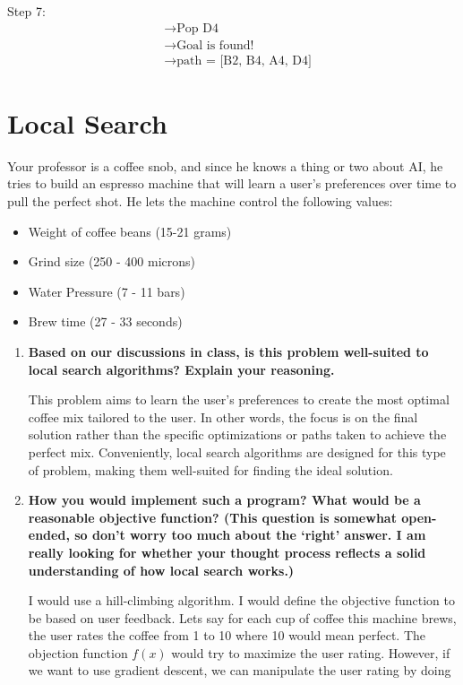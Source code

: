 \documentclass[a4paper]{article}
\begin{document}
\begin{sloppypar}
\begin{enumerate}[start=6,label=Q\arabic*,left=0pt]
    \par Step 7:
    \begin{align*}
        &\rightarrow \text{Pop D4} \\
        &\rightarrow \text{Goal is found!} \\
        &\rightarrow \text{path = [B2, B4, A4, D4]}
    \end{align*}

\end{enumerate}

\section{Local Search}

Your professor is a coffee snob, and since he knows a thing or two about AI, he tries to
build an espresso machine that will learn a user’s preferences over time to pull the perfect
shot. He lets the machine control the following values:

\begin{itemize}
    \item Weight of coffee beans (15-21 grams)
    \item Grind size (250 - 400 microns)
    \item Water Pressure (7 - 11 bars)
    \item Brew time (27 - 33 seconds)
\end{itemize}

\begin{enumerate}[start=9,label=Q\arabic*,left=0pt]
    \item \textbf{Based on our discussions in class, is this problem well-suited to local search algorithms? Explain your reasoning.}
    \par This problem aims to learn the user’s preferences to create the most optimal coffee mix tailored to the user. 
    In other words, the focus is on the final solution rather than the specific optimizations or paths taken to achieve the perfect mix. 
    Conveniently, local search algorithms are designed for this type of problem, making them well-suited for finding the ideal solution.
    
    \item \textbf{How you would implement such a program? What would be a reasonable objective function? (This question is somewhat open-ended, so don’t worry too much about the ‘right’ answer. I am really looking for whether your thought process reflects a solid understanding of how local search works.)}
    \par I would use a hill-climbing algorithm. I would define the objective function to be based on user feedback.
    Lets say for each cup of coffee this machine brews, the user rates the coffee from 1 to 10 where 10 would mean perfect.
    The objection function $f(x)$ would try to maximize the user rating. However, if we want to use gradient descent, we can manipulate the 
    user rating by doing 
    

\end{enumerate}
\end{sloppypar}
\end{document}
